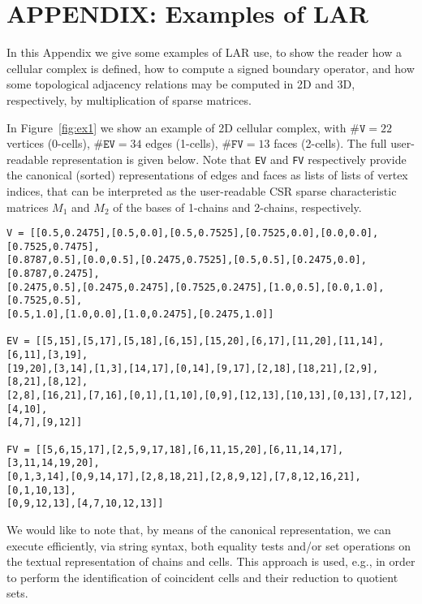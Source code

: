 \appendix
\label{appendix}

\section{APPENDIX: Examples of LAR}
\label{sec:lar-examples}

In this Appendix we give some examples of LAR use, to {show} the reader how a cellular complex is defined, how to compute a signed boundary operator, and how some topological adjacency relations may be computed in 2D and 3D, respectively, by multiplication of sparse matrices.

\begin{example} %

In Figure~\ref{fig:ex1} we show an example of 2D cellular complex, with $\#\texttt{V} = 22$ vertices (0-cells), $\#\texttt{EV} = 34$ edges (1-cells), $\#\texttt{FV} = 13$ faces (2-cells). The full user-readable representation is given below. Note that \texttt{EV} and \texttt{FV} respectively provide the canonical (sorted) representations  of edges and faces as lists of lists of vertex indices, that can be interpreted as the user-readable CSR sparse characteristic matrices $M_1$ and $M_2$ of the bases of 1-chains and 2-chains, respectively.

\begin{verbatim}
V = [[0.5,0.2475],[0.5,0.0],[0.5,0.7525],[0.7525,0.0],[0.0,0.0],[0.7525,0.7475],
[0.8787,0.5],[0.0,0.5],[0.2475,0.7525],[0.5,0.5],[0.2475,0.0],[0.8787,0.2475],
[0.2475,0.5],[0.2475,0.2475],[0.7525,0.2475],[1.0,0.5],[0.0,1.0],[0.7525,0.5],
[0.5,1.0],[1.0,0.0],[1.0,0.2475],[0.2475,1.0]]

EV = [[5,15],[5,17],[5,18],[6,15],[15,20],[6,17],[11,20],[11,14],[6,11],[3,19], 
[19,20],[3,14],[1,3],[14,17],[0,14],[9,17],[2,18],[18,21],[2,9],[8,21],[8,12], 
[2,8],[16,21],[7,16],[0,1],[1,10],[0,9],[12,13],[10,13],[0,13],[7,12],[4,10], 
[4,7],[9,12]]

FV = [[5,6,15,17],[2,5,9,17,18],[6,11,15,20],[6,11,14,17],[3,11,14,19,20], 
[0,1,3,14],[0,9,14,17],[2,8,18,21],[2,8,9,12],[7,8,12,16,21],[0,1,10,13], 
[0,9,12,13],[4,7,10,12,13]]
\end{verbatim}

We would like to note that, by means of the canonical representation, we can execute efficiently, via string syntax, both equality tests and/or set operations on the textual representation of chains and cells. This approach is used, e.g., in order to perform the identification of coincident cells and their reduction to quotient sets.


\end{example}

